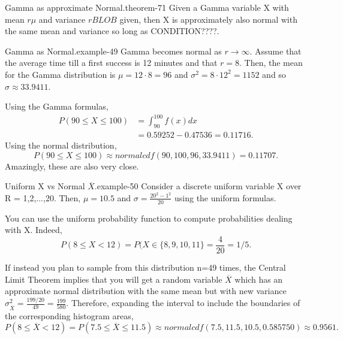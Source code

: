 \documentclass[10pt,]{book}
\numberwithin{equation}{section}
\newcommand{\lt}{<}
\begin{document}
\begin{theorem}{Gamma as approximate Normal.}{}{theorem-71}%
\hypertarget{p-1304}{}%
Given a Gamma variable X with mean \(r \mu\) and variance \(r BLOB\) given, then X is approximately also normal with the same mean and variance so long as CONDITION????.%
\end{theorem}
\begin{example}{Gamma as Normal.}{example-49}%
\hypertarget{p-1305}{}%
Gamma becomes normal as \(r \rightarrow \infty\).  Assume that the average time till a first success is 12 minutes and that \(r = 8\).  Then, the mean for the Gamma distribution is \(\mu = 12 \cdot 8 = 96\) and \(\sigma^2 = 8 \cdot 12^2 = 1152\) and so \(\sigma \approx 33.9411\).%
\par
\hypertarget{p-1306}{}%
Using the Gamma formulas,%
\begin{align*}
P( 90 \le X \le 100 ) & = \int_{90}^{100} f(x) dx \\
& = 0.59252 - 0.47536 = 0.11716.
\end{align*}
Using the normal distribution,%
\begin{equation*}
P( 90 \le X \le 100) \approx normalcdf(90,100,96,33.9411) = 0.11707.
\end{equation*}
Amazingly, these are also very close.%
\end{example}
\begin{example}{Uniform X vs Normal \(\overline{X}\).}{example-50}%
\hypertarget{p-1307}{}%
Consider a discrete uniform variable X over R = {1,2,...,20}.  Then, \(\mu = 10.5\) and \(\sigma = \frac{20^2-1^2}{20}\) using the uniform formulas.%
\par
\hypertarget{p-1308}{}%
You can use the uniform probability function to compute probabilities dealing with X. Indeed,%
\begin{equation*}
P(8 \le X \lt 12) = P(X \in \{8,9,10,11 \} = \frac{4}{20} = 1/5.
\end{equation*}
%
\par
\hypertarget{p-1309}{}%
If instead you plan to sample from this distribution n=49 times, the Central Limit Theorem implies that you will get a random variable \(\overline{X}\) which has an approximate normal distribution with the same mean but with new variance \(\sigma_{\overline{X}}^2 = \frac{199/20}{49} = \frac{199}{580}\).  Therefore, expanding the interval to include the boundaries of the corresponding histogram areas,%
\begin{equation*}
P( 8 \le \overline{X} \lt 12 ) = P(7.5 \le \overline{X} \le 11.5) \approx normalcdf(7.5,11.5,10.5,0.585750) \approx 0.9561 .
\end{equation*}
%
\end{example}
\end{document}
